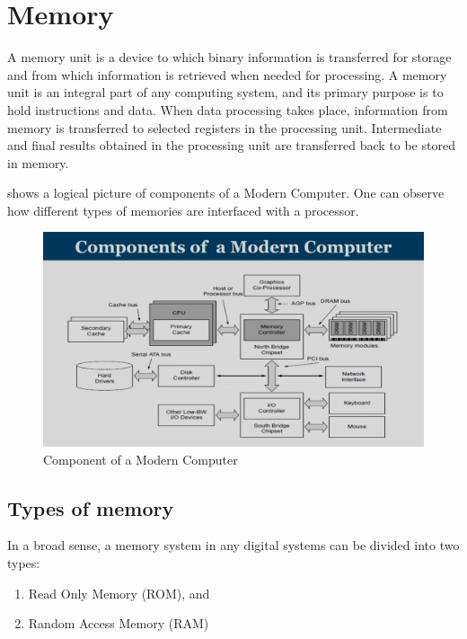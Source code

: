 \section{Memory}
A memory unit is a device to which binary information is transferred for storage and from which information is retrieved when needed for processing. A memory unit is an integral part of any computing system, and its primary purpose is to hold instructions and data. When data processing takes place, information from memory is transferred to selected registers in the processing unit. Intermediate and final results obtained in the processing unit are transferred back to be
stored in memory.

\par {} shows a logical picture of components of a Modern Computer. One can observe how different types of memories are interfaced with a processor.

\begin{figure}[H]
	\begin{center}
		\includegraphics[width=\textwidth]{images/ModernComputer.png}
		\caption{Component of a Modern Computer}
		\label{ModernComputer}
	\end{center}
\end{figure}


\subsection{Types of memory}
In a broad sense, a memory system in any digital systems can be divided into two types:
\begin{enumerate}
    \item Read Only Memory (ROM), and
    \item Random Access Memory (RAM)
\end{enumerate}
 
